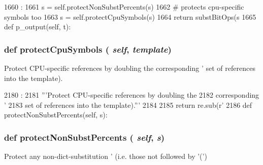 \begin{DoxyCode}
1660                                :
1661         s = self.protectNonSubstPercents(s)
1662         # protects cpu-specific symbols too
1663         s = self.protectCpuSymbols(s)
1664         return substBitOps(s %
1665 
    def p_output(self, t):
\end{DoxyCode}
\hypertarget{classisa__parser_1_1ISAParser_a2f6c17f128739cc7bc4104ed758a34db}{
\subsubsection[{protectCpuSymbols}]{\setlength{\rightskip}{0pt plus 5cm}def protectCpuSymbols ( {\em self}, \/   {\em template})}}
\label{classisa__parser_1_1ISAParser_a2f6c17f128739cc7bc4104ed758a34db}
\begin{DoxyVerb}Protect CPU-specific references by doubling the
corresponding '%
set of references into the template).\end{DoxyVerb}
 


\begin{DoxyCode}
2180                                          :
2181         '''Protect CPU-specific references by doubling the
2182         corresponding '%
2183         set of references into the template).'''
2184 
2185         return re.sub(r'%
2186 
    def protectNonSubstPercents(self, s):
\end{DoxyCode}
\hypertarget{classisa__parser_1_1ISAParser_a2239b832b8c15269ab3c1a421eb74938}{
\subsubsection[{protectNonSubstPercents}]{\setlength{\rightskip}{0pt plus 5cm}def protectNonSubstPercents ( {\em self}, \/   {\em s})}}
\label{classisa__parser_1_1ISAParser_a2239b832b8c15269ab3c1a421eb74938}
\begin{DoxyVerb}Protect any non-dict-substitution '%
(i.e. those not followed by '(')\end{DoxyVerb}
 


